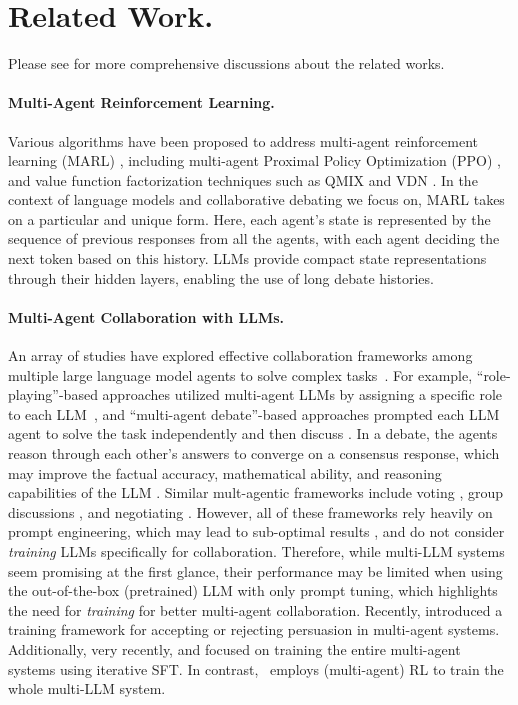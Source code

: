 \section{Related Work.}
Please see  for more comprehensive discussions about the related works.
\paragraph{Multi-Agent Reinforcement Learning. }
Various algorithms have been proposed to address multi-agent reinforcement learning (MARL) \cite{hernandez2019survey,zhang2021multi},  including multi-agent Proximal Policy Optimization (PPO) \citep{yu2022surprising}, and value function factorization techniques such as QMIX and VDN \citep{rashid2020monotonic, sunehag2017value}. In the context of language models and collaborative debating we focus on, MARL takes on a particular and unique form. Here, each agent's state is represented by the sequence of previous responses from all the agents, with each agent deciding the next token based on this history. LLMs provide compact state representations through their hidden layers, enabling the use of long debate histories. 

\paragraph{Multi-Agent Collaboration with LLMs. }
An array of studies have explored effective collaboration frameworks among multiple large language model agents to solve complex tasks~\citep{wu2023autogen, li2024improving, zhao2024longagent}. For example, ``role-playing''-based approaches utilized multi-agent LLMs by assigning a specific role to each LLM~\citep{li2023camel}, and ``multi-agent debate''-based approaches prompted  each LLM agent to solve the task independently and then discuss \citep{du2023improving,khandebating}. 
In a debate, the agents reason through each other's answers to converge on a consensus  response, which may improve the factual accuracy, mathematical ability, and reasoning capabilities of the LLM \citep{du2023improving,liang2023encouraging, kim2024adaptive}. Similar mult-agentic frameworks include voting \citep{wang2023selfconsistency}, group discussions \citep{chen2024reconcile}, and negotiating \citep{fu2023improving}. However, all of these frameworks rely heavily on prompt engineering, which may lead to sub-optimal results \citep{huang2023large}, and do not consider {\it training} LLMs specifically for collaboration. Therefore, while 
multi-LLM systems seem promising at the first glance, their performance may be limited when using the  out-of-the-box  (pretrained)  LLM with only prompt tuning, which highlights the need for {\it training} for better multi-agent collaboration. Recently, \citet{stengel2024teaching} introduced a training framework for accepting or rejecting persuasion in multi-agent systems. Additionally, {very recently,} 
\citet{subramaniam2025multiagent} and \citet{zhao2025sirius} focused on training the entire multi-agent systems using iterative SFT.
In contrast,  \ourstwo~employs (multi-agent) RL to train the whole multi-LLM system.




